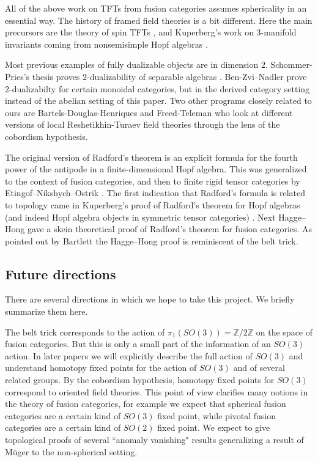 \documentclass{amsart}
\begin{document}
All of the above work on TFTs from fusion categories assumes sphericality in an essential way.  The history of framed field theories is a bit different.  Here the main precursors are the theory of spin TFTs \cite{MR1117149, MR1171303, MR1387228, MR1880321}, and Kuperberg's work on $3$-manifold invariants coming from nonsemisimple Hopf algebras \cite{MR1394749}.

Most previous examples of fully dualizable objects are in dimension $2$.  Schommer-Pries's thesis proves $2$-dualizability of separable algebras \cite{???}.    Ben-Zvi--Nadler \cite{???} prove $2$-dualizabilty for certain monoidal categories, but in the derived category setting instead of the abelian setting of this paper.   Two other programs closely related to ours are Bartels-Douglas-Henriques \cite{???} and Freed-Teleman \cite{???} who look at different versions of local Reshetikhin-Turaev field theories through the lens of the cobordism hypothesis.

The original version of Radford's theorem \cite{MR0407069} is an explicit formula for the fourth power of the antipode in a finite-dimensional Hopf algebra.  This was generalized to the context of fusion categories, and then to finite rigid tensor categories by Etingof--Nikshych--Ostrik \cite{MR2183279,MR2097289}.  The first indication that Radford's formula is related to topology came in Kuperberg's proof of Radford's theorem for Hopf algebras (and indeed Hopf algebra objects in symmetric tensor categories) \cite{MR1394749}.  Next Hagge--Hong \cite{MR2559711} gave a skein theoretical proof of Radford's theorem for fusion categories.  As pointed out by Bartlett \cite{0901.3975} the Hagge--Hong proof is reminiscent of the belt trick.

\subsection*{Future directions}


There are several directions in which we hope to take this project. We briefly summarize them here.

The belt trick corresponds to the action of $\pi_1(SO(3)) = \mathbb{Z}/2\mathbb{Z}$ on the space of fusion categories.  But this is only a small part of the information of an $SO(3)$ action.  In later papers we will explicitly describe the full action of $SO(3)$ and understand homotopy fixed points for the action of $SO(3)$ and of several related groups.  By the cobordism hypothesis, homotopy fixed points for $SO(3)$ correspond to oriented field theories.  This point of view clarifies many notions in the theory of fusion categories, for example we expect that spherical fusion categories are a certain kind of $SO(3)$ fixed point, while pivotal fusion categories are a certain kind of $SO(2)$ fixed point.  We expect to give topological proofs of several ``anomaly vanishing" results generalizing a result of M\"uger \cite{MR1966525} to the non-spherical setting. 
\end{document}
